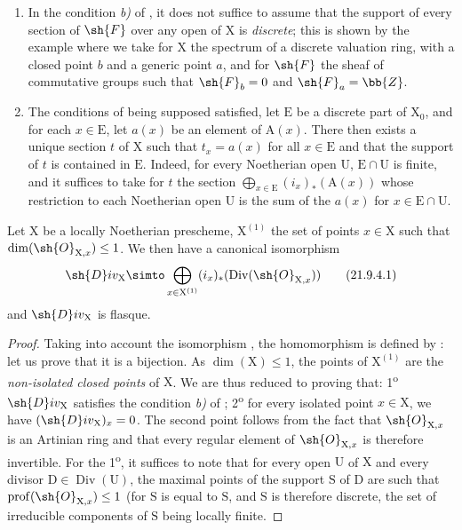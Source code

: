 \begin{remark}[21.9.3]
\label{IV.21.9.3}
\begin{enumerate}[label=(\roman*)]
  \item In the condition \emph{b)} of , it does not suffice to assume that the support of every section of $\sh{F}$ over any open of $\mathrm{X}$ is \emph{discrete};
this is shown by the example where we take for $\mathrm{X}$ the spectrum of a discrete valuation ring, with a closed point $b$ and a generic point $a$, and for $\sh{F}$ the sheaf of commutative groups such that $\sh{F}_b=0$ and $\sh{F}_a=\bb{Z}$.

  \item The conditions of  being supposed satisfied, let $\mathrm{E}$ be a discrete part of $\mathrm{X}_0$, and for each $x\in\mathrm{E}$, let $a(x)$ be an element of $\mathrm{A}(x)$.
There then exists a unique section $t$ of $\mathrm{X}$ such that $t_x=a(x)$ for all $x\in\mathrm{E}$ and that the support of $t$ is contained in $\mathrm{E}$.
Indeed, for every Noetherian open $\mathrm{U}$, $\mathrm{E}\cap\mathrm{U}$ is finite, and it suffices to take for $t$ the section $\bigoplus_{x\in\mathrm{E}}(i_x)_*(\mathrm{A}(x))$ whose restriction to each Noetherian open $\mathrm{U}$ is the sum of the $a(x)$ for $x\in\mathrm{E}\cap\mathrm{U}$.
\end{enumerate}
\end{remark}

\begin{proposition}[21.9.4]
\label{IV.21.9.4}
Let $\mathrm{X}$ be a locally Noetherian prescheme, $\mathrm{X}^{(1)}$ the set of points $x\in\mathrm{X}$ such that $\dim(\sh{O}_{\mathrm{X},x})\leq 1$.
We then have a canonical isomorphism
\[
\label{IV.21.9.4.1}
  \sh{D}iv_\mathrm{X}\simto\bigoplus_{x\in\mathrm{X}^{(1)}}(i_x)_*(\operatorname{Div}(\sh{O}_{\mathrm{X},x}))
  \tag{21.9.4.1}
\]
and $\sh{D}iv_\mathrm{X}$ is flasque.
\end{proposition}

\begin{proof}
Taking into account the isomorphism , the homomorphism  is defined by :
let us prove that it is a bijection.
As $\dim(\mathrm{X})\leq 1$, the points of $\mathrm{X}^{(1)}$ are the \emph{non-isolated closed points} of $\mathrm{X}$.
We are thus reduced to proving that:
1\textsuperscript{o} $\sh{D}iv_\mathrm{X}$ satisfies the condition \emph{b)} of ;
2\textsuperscript{o} for every isolated point $x\in\mathrm{X}$, we have $(\sh{D}iv_\mathrm{X})_x=0$.
The second point follows from the fact that $\sh{O}_{\mathrm{X},x}$ is an Artinian ring and that every regular element of $\sh{O}_{\mathrm{X},x}$ is therefore invertible.
For the 1\textsuperscript{o}, it suffices to note that for every open $\mathrm{U}$ of $\mathrm{X}$ and every divisor $\mathrm{D}\in\operatorname{Div}(\mathrm{U})$, the maximal points of the support $\mathrm{S}$ of $\mathrm{D}$ are such that $\operatorname{prof}(\sh{O}_{\mathrm{X},x})\leq 1$ (for $\mathrm{S}$ is equal to $\mathrm{S}$, and $\mathrm{S}$ is therefore discrete, the set of irreducible components of $\mathrm{S}$ being locally finite.
\end{proof}

